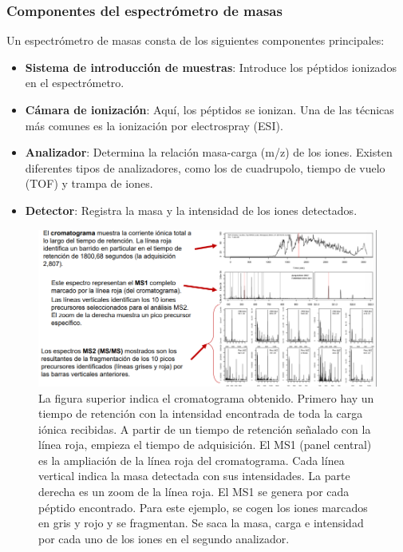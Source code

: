 \subsubsection{Componentes del espectrómetro de masas}
Un espectrómetro de masas consta de los siguientes componentes principales:
\begin{itemize}
\item \textbf{Sistema de introducción de muestras}: Introduce los péptidos ionizados en el espectrómetro.
\item \textbf{Cámara de ionización}: Aquí, los péptidos se ionizan. Una de las técnicas más comunes es la ionización por electrospray (ESI).
\item \textbf{Analizador}: Determina la relación masa-carga (m/z) de los iones. Existen diferentes tipos de analizadores, como los de cuadrupolo, tiempo de vuelo (TOF) y trampa de iones.
\item \textbf{Detector}: Registra la masa y la intensidad de los iones detectados.
\end{itemize}

\begin{figure}[h]
\centering
\includegraphics[width = \textwidth]{figs/espectro-analisis.png}
\caption{La figura superior indica el cromatograma obtenido. Primero hay un tiempo de retención con la intensidad encontrada de toda la carga iónica recibidas. A partir de un tiempo de retención señalado con la línea roja, empieza el tiempo de adquisición. El MS1 (panel central) es la ampliación de la línea roja del cromatograma. Cada línea vertical indica la masa detectada con sus intensidades. La parte derecha es un zoom de la línea roja. El MS1 se genera por cada péptido encontrado. Para este ejemplo, se cogen los iones marcados en gris y rojo y se fragmentan. Se saca la masa, carga e intensidad por cada uno de los iones en el segundo analizador. }
\end{figure}

